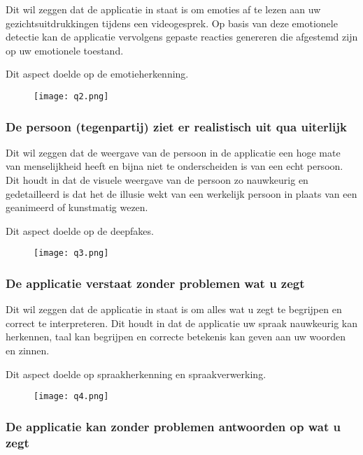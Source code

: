 Dit wil zeggen  dat de applicatie in staat is om emoties af te lezen aan uw gezichtsuitdrukkingen tijdens een videogesprek. Op basis van deze emotionele detectie kan de applicatie vervolgens gepaste reacties genereren die afgestemd zijn op uw emotionele toestand.

Dit aspect doelde op de emotieherkenning.

\begin{figure}[htbp]
    \centering
    \texttt{[image: q2.png]}
    \label{fig:vraag_2_resultaat}
\end{figure}

\subsubsection{De persoon (tegenpartij) ziet er realistisch uit qua uiterlijk}

Dit wil zeggen dat de weergave van de persoon in de applicatie een hoge mate van menselijkheid heeft en bijna niet te onderscheiden is van een echt persoon. Dit houdt in dat de visuele weergave van de persoon zo nauwkeurig en gedetailleerd is dat het de illusie wekt van een werkelijk persoon in plaats van een geanimeerd of kunstmatig wezen.

Dit aspect doelde op de deepfakes.

\begin{figure}[htbp]
    \centering
    \texttt{[image: q3.png]}
    \label{fig:vraag_3_resultaat}
\end{figure}

\subsubsection{De applicatie verstaat zonder problemen wat u zegt}

Dit wil zeggen dat de applicatie in staat is om alles wat u zegt te begrijpen en correct te interpreteren. Dit houdt in dat de applicatie uw spraak nauwkeurig kan herkennen, taal kan begrijpen en correcte betekenis kan geven aan uw woorden en zinnen.

Dit aspect doelde op spraakherkenning en spraakverwerking.

\begin{figure}[htbp]
    \centering
    \texttt{[image: q4.png]}
    \label{fig:vraag_4_resultaat}
\end{figure}

\subsubsection{De applicatie kan zonder problemen antwoorden op wat u zegt}

